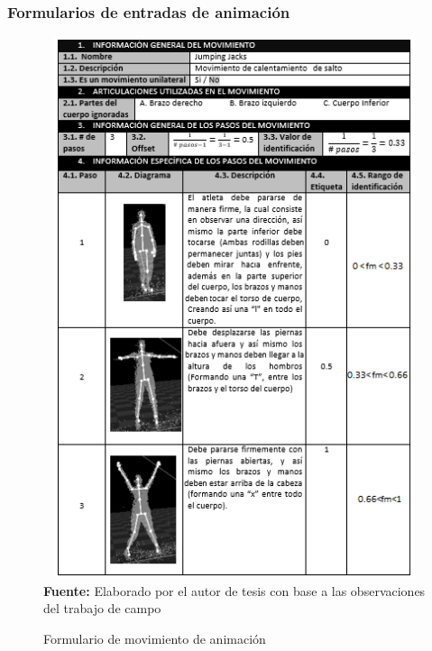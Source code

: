 \subsubsection{Formularios de entradas de animaci\'on}
\begin{figure}[H]
	\caption{Formulario de movimiento de animaci\'on}
	\label{fig:frmMovCheer}
	\centering	\includegraphics[width=445px,height=600px]{graphics/resultados/movimientoCheerleader.PNG} \\
	\textbf{Fuente:} Elaborado por el autor de tesis con base a las observaciones del trabajo de campo
\end{figure}
